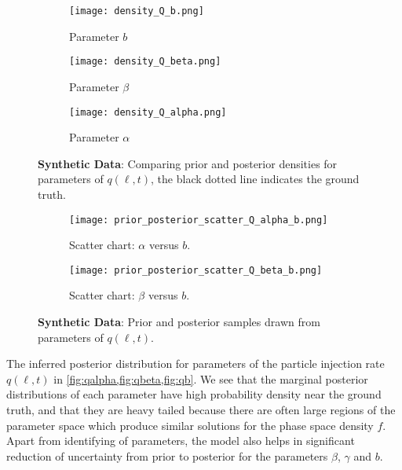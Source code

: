 \begin{figure*}[!htb]
  \centering
  \begin{subfigure}[b]{0.5\textwidth}
    \centering
    \texttt{[image: density\_Q\_b.png]}
    \caption{ {\small Parameter $b$}}
    \label{fig:qb}
  \end{subfigure}
  \hfill
  \begin{subfigure}[b]{0.5\textwidth}
    \centering
    \texttt{[image: density\_Q\_beta.png]}
    \caption{{\small Parameter $\beta$}}
    \label{fig:qbeta}
  \end{subfigure}
  \hfill
  \begin{subfigure}[b]{0.5\textwidth}
    \centering
    \texttt{[image: density\_Q\_alpha.png]}
    \caption{{\small Parameter $\alpha$}}
    \label{fig:qalpha}
  \end{subfigure}
  \caption{\textbf{Synthetic Data}: Comparing prior and posterior densities for 
  parameters of $q(\ell, t)$, the black dotted line indicates the ground truth.}  
\end{figure*}

\begin{figure*}[!htb]
  \centering
  \begin{subfigure}[b]{0.75\textwidth}
    \centering
    \texttt{[image: prior\_posterior\_scatter\_Q\_alpha\_b.png]}
    \caption{{\small Scatter chart: $\alpha$ versus $b$.}}
    \label{fig:alphavsb}
  \end{subfigure}
  \hfill
  \begin{subfigure}[b]{0.75\textwidth}
    \centering
    \texttt{[image: prior\_posterior\_scatter\_Q\_beta\_b.png]}
    \caption{{\small Scatter chart: $\beta$ versus $b$.}}
    \label{fig:betavsb}
  \end{subfigure}
  \caption{\textbf{Synthetic Data}: Prior and posterior samples drawn 
  from parameters of $q(\ell, t)$.}
\end{figure*}


The inferred posterior distribution for parameters of the particle injection rate $q(\ell, t)$ in 
\cref{fig:qalpha,fig:qbeta,fig:qb}. We see that the marginal posterior distributions of each 
parameter have high probability density near the ground truth, and that they are heavy tailed 
because there are often large regions of the parameter space which produce similar solutions for 
the phase space density $f$. Apart from identifying of parameters, the model also helps in 
significant reduction of uncertainty from prior to posterior for the parameters $\beta$, 
$\gamma$ and $b$.

